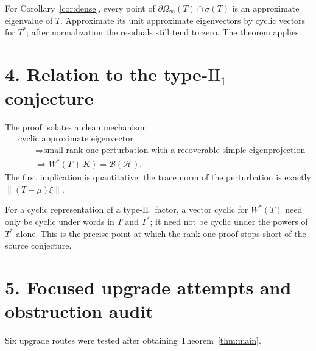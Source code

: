 \documentclass[11pt]{article}
\newcommand{\B}{\mathcal B}
\newcommand{\Hh}{\mathcal H}
\begin{document}
For Corollary~\ref{cor:dense}, every point of $\partial\Omega_\infty(T)\cap\sigma(T)$ is an approximate eigenvalue of $T$.  Approximate its unit approximate eigenvectors by cyclic vectors for $T^*$; after normalization the residuals still tend to zero.  The theorem applies.

\section*{4. Relation to the type-$\mathrm{II}_1$ conjecture}

The proof isolates a clean mechanism:
\[
\begin{aligned}
&\text{cyclic approximate eigenvector}\\
&\qquad\Longrightarrow
\text{small rank-one perturbation with a recoverable simple eigenprojection}\\
&\qquad\Longrightarrow W^*(T+K)=\B(\Hh).
\end{aligned}
\]
The first implication is quantitative: the trace norm of the perturbation is exactly
$\lVert(T-\mu)\xi\rVert$.

For a cyclic representation of a type-$\mathrm{II}_1$ factor, a vector cyclic for $W^*(T)$ need only be cyclic under words in $T$ and $T^*$; it need not be cyclic under the powers of $T^*$ alone.  This is the precise point at which the rank-one proof stops short of the source conjecture.

\section*{5. Focused upgrade attempts and obstruction audit}

Six upgrade routes were tested after obtaining Theorem~\ref{thm:main}.
\end{document}
